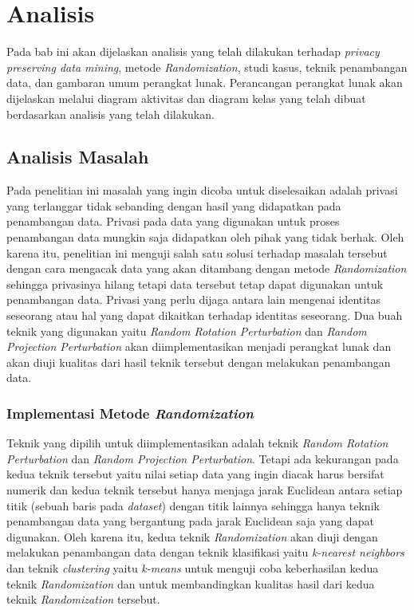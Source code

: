 \chapter{Analisis}
\label{chap:analisis}

Pada bab ini akan dijelaskan analisis yang telah dilakukan terhadap \textit{privacy preserving data mining}, metode \textit{Randomization}, studi kasus, teknik penambangan data, dan gambaran umum perangkat lunak. Perancangan perangkat lunak akan dijelaskan melalui diagram aktivitas dan diagram kelas yang telah dibuat berdasarkan analisis yang telah dilakukan.

\section{Analisis Masalah}
\label{sec:analisis-masalah}

Pada penelitian ini masalah yang ingin dicoba untuk diselesaikan adalah privasi yang terlanggar tidak sebanding dengan hasil yang didapatkan pada penambangan data. Privasi pada data yang digunakan untuk proses penambangan data mungkin saja didapatkan oleh pihak yang tidak berhak. Oleh karena itu, penelitian ini menguji salah satu solusi terhadap masalah tersebut dengan cara mengacak data yang akan ditambang dengan metode \textit{Randomization} sehingga privasinya hilang tetapi data tersebut tetap dapat digunakan untuk penambangan data. Privasi yang perlu dijaga antara lain mengenai identitas seseorang atau hal yang dapat dikaitkan terhadap identitas seseorang. Dua buah teknik yang digunakan yaitu \textit{Random Rotation Perturbation} dan \textit{Random Projection Perturbation} akan diimplementasikan menjadi perangkat lunak dan akan diuji kualitas dari hasil teknik tersebut dengan melakukan penambangan data.

\subsection{Implementasi Metode \textit{Randomization}}
\label{subsec:analisis-ppdm}

Teknik yang dipilih untuk diimplementasikan adalah teknik \textit{Random Rotation Perturbation} dan \textit{Random Projection Perturbation}. Tetapi ada kekurangan pada kedua teknik tersebut yaitu nilai setiap data yang ingin diacak harus bersifat numerik dan kedua teknik tersebut hanya menjaga jarak Euclidean antara setiap titik (sebuah baris pada \textit{dataset}) dengan titik lainnya sehingga hanya teknik penambangan data yang bergantung pada jarak Euclidean saja yang dapat digunakan. Oleh karena itu, kedua teknik \textit{Randomization} akan diuji dengan melakukan penambangan data dengan teknik klasifikasi yaitu \textit{k-nearest neighbors} dan teknik \textit{clustering} yaitu \textit{k-means} untuk menguji coba keberhasilan kedua teknik \textit{Randomization} dan untuk membandingkan kualitas hasil dari kedua teknik \textit{Randomization} tersebut.

